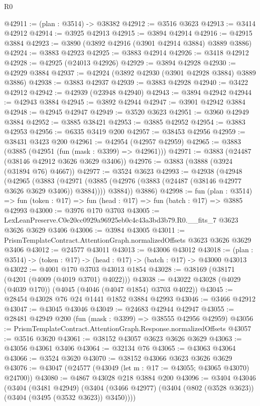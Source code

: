 \begin{lexlean}{R0}
\begin{coremodule}
@42911 := (plan : @3514) -> @38382
@42912 := @3516 @3623
@42913 := @3414 @42912
@42914 := @3925 @42913
@42915 := @3894 @42914
@42916 := @42915 @3884
@42923 := @3890 (@3892 @42916 (@3901 @42914 @3884) @3889 @3886)
@42924 := @3883 @42923
@42925 := @3883 @42914
@42926 := @3418 @42912
@42928 := @42925 (@24013 @42926)
@42929 := @3894 @42928
@42930 := @42929 @3884
@42937 := @42924 (@3892 @42930 (@3901 @42928 @3884) @3889 @3886)
@42938 := @3883 @42937
@42939 := @3883 @42928
@42940 := @3422 @42912
@42942 := @42939 (@23948 @42940)
@42943 := @3894 @42942
@42944 := @42943 @3884
@42945 := @3892 @42944
@42947 := @3901 @42942 @3884
@42948 := @42945 @42947
@42949 := @3520 @3623
@42951 := @3960 @42949 @3884
@42952 := @3885 @38421
@42953 := @3885 @42952
@42954 := @3883 @42953
@42956 := @6335 @3419 @200
@42957 := @38453 @42956
@42959 := @38431 @3423 @200
@42961 := @42954 (@42957 @42959)
@42965 := @3883 (@3885 (@42951 (fun (mask : @3399) => @42961)))
@42971 := @3883 (@24487 (@38146 @42912 @3626 @3629 @3406))
@42976 := @3883 (@3888 (@3924 (@31894 @76) @4667))
@42977 := @3524 @3623
@42993 := @42938
    (@42948
      (@42965
        (@3883
          (@42971 (@3885 (@42976 (@3883 (@24487 (@38146 @42977 @3626 @3629 @3406)) @3884))))
          @3884))
      @3886)
@42998 := fun (plan : @3514) =>
  fun (token : @17) => fun (head : @17) => fun (batch : @17) => @3885 @42993
@43000 := @3976 @170 @3703
@43005 := LexLeanPreserve.C0e20cc0929a96925eb0c4c43a3bd3b79.R0.__fits_7 @3623 @3626 @3629 @3406
@43006 := @3984 @43005
@43011 := PrismTemplateContract.AttentionGraph.normalizedOffsets @3623 @3626 @3629 @3406
@43012 := @24577 @43011
@43013 := @43006 @43012
@43018 := (plan : @3514) -> (token : @17) -> (head : @17) -> (batch : @17) -> @43000 @43013
@43022 := @4001 @170 @3703 @43013 @1854
@43028 := @38169 (@38171 (@4201 (@4009 (@4019 @3701) @4022)))
@43038 := @43022 @43028 (@4029 (@4039 @170)) (@4045 (@4046 (@4047 @1854) @3703 @4022))
@43045 := @28454 @43028 @76 @24 @1441 @1852 @3884 @42993
@43046 := @3466 @42912
@43047 := @43045 @43046
@43049 := @24683 @42944 @42947
@43055 := @28481 @42949 @200 (fun (mask : @3399) => @38555 @42956 @42959)
@43056 := PrismTemplateContract.AttentionGraph.Response.normalizedOffsets
@43057 := @3516 @3620
@43061 := @38152 @43057 @3623 @3626 @3629
@43063 := @43056 @43061 @3406
@43064 := @32134 @76
@43065 := @43063 @43064
@43066 := @3524 @3620
@43070 := @38152 @43066 @3623 @3626 @3629
@43076 := @43047 (@24577 (@43049 (let m : @17 := @43055; @43065 @43070) @24700))
@43080 := @4867 @43028 @218 @3884 @200
@43096 := @3404
    @43046
    (@3404
      (@3481 @42949)
      (@3404 (@3466 @42977) (@3404 (@802 (@3528 @3623)) (@3404 (@3495 (@3532 @3623)) @3450))))

\end{coremodule}
\end{lexlean}

